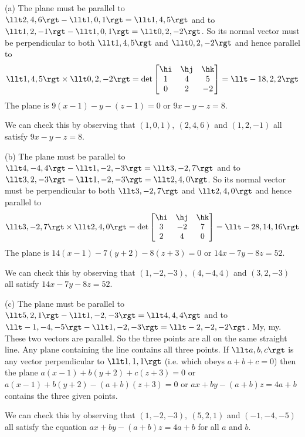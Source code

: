 \begin{solution}
(a) The plane must be parallel to 
   $\llt 2,4,6\rgt -\llt 1,0,1\rgt =\llt 1,4,5\rgt $
 and to $\llt 1,2,-1\rgt -\llt 1,0,1\rgt =\llt 0,2,-2\rgt $. 
So its normal vector must be perpendicular to both $\llt 1,4,5\rgt $ 
and $\llt 0,2,-2\rgt $ and hence parallel to
\begin{equation*}
\llt 1,4,5\rgt \times\llt 0,2,-2\rgt 
=\det\left[\begin{matrix}
           \hi & \hj & \hk \\
           1  &  4  &  5 \\
           0  &  2  &  -2
  \end{matrix}\right]
=\llt -18,2,2\rgt
\end{equation*} 
The plane is $9(x-1)-y-(z-1)=0$ or $9x-y-z=8$. 

We can check this by observing that 
$(1,0,1),\ (2,4,6)$ and $(1,2,-1)$ all satisfy $9x-y-z=8$.

(b) The plane must be parallel to 
$\llt 4,-4,4\rgt -\llt 1,-2,-3\rgt =\llt 3,-2,7\rgt $
and to $\llt 3,2,-3\rgt -\llt 1,-2,-3\rgt =\llt 2,4,0\rgt $. So its normal 
vector must be perpendicular to both $\llt 3,-2,7\rgt $ and $\llt 2,4,0\rgt$ 
and hence parallel to
\begin{equation*}
\llt 3,-2,7\rgt \times\llt 2,4,0\rgt 
=\det\left[\begin{matrix}
           \hi & \hj & \hk \\
           3  &  -2  &  7 \\
           2  &  4  &  0
  \end{matrix}\right]
=\llt -28,14,16\rgt
\end{equation*} 
The plane is $14(x-1)-7(y+2)-8(z+3)=0$ or $14x-7y-8z=52$. 

We can check this by observing that 
$(1,-2,-3),\ (4,-4,4)$ and $(3,2,-3)$ all satisfy $14x-7y-8z=52$.

(c) The plane must be parallel to 
     $\llt 5,2,1\rgt -\llt 1,-2,-3\rgt =\llt 4,4,4\rgt $
 and to $\llt -1,-4,-5\rgt -\llt 1,-2,-3\rgt =\llt -2,-2,-2\rgt $. 
My, my. These two vectors are parallel. So the three points are all on the 
same straight line. Any plane containing the line contains all three points. 
If $\llt a,b,c\rgt$ is any vector perpendicular to $\llt 1,1,1\rgt$ 
(i.e. which obeys $a+b+c=0$) then the plane  
$a(x-1)+b(y+2)+c(z+3)=0$ or $a(x-1)+b(y+2)-(a+b)(z+3)=0$ 
or $ax+by-(a+b)z=4a+b$ contains the three given points. 

We can check this by observing that 
$(1,-2,-3),\ (5,2,1)$ and $(-1,-4,-5)$ all
satisfy the equation $ax+by-(a+b)z=4a+b$ for all $a$ and $b$.
\end{solution}

